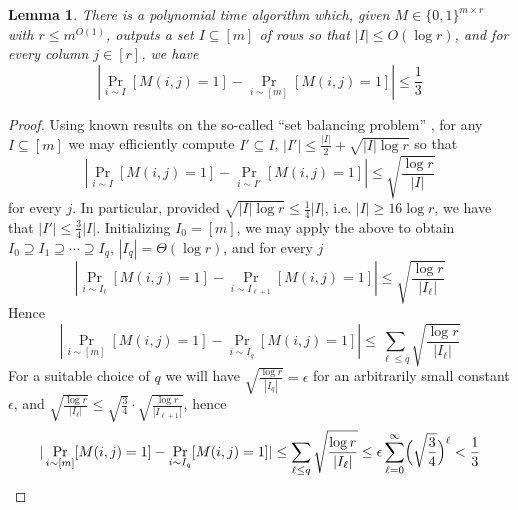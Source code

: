 \documentclass[11pt]{article}
\newtheorem{lemma}{Lemma}
\newcommand{\B}{\{0,1\}}
\begin{document}
\begin{lemma}
There is a polynomial time algorithm which, given $M \in \B^{m \times r}$ with $r \leq m^{O(1)}$, outputs a set $I \subseteq [m]$ of rows so that $|I| \leq O(\log r)$, and for every column $j \in [r]$, we have 
\[
|\Pr_{i \sim I}[M(i,j) = 1] - \Pr_{i \sim [m]}[M(i,j) = 1]| \leq \frac{1}{3}
\]
\end{lemma}
\begin{proof}
Using known results on the so-called ``set balancing problem'' \cite{setbalancing}, for any $I \subseteq [m]$ we may efficiently compute $I'\subseteq I$, $|I'| \leq \frac{|I|}{2} + \sqrt{|I| \log r}$ so that 
\[
|\Pr_{i \sim I}[M(i,j) = 1] - \Pr_{i \sim I
'}[M(i,j) = 1]| \leq \sqrt{\frac{\log r}{|I|}}
\]
for every $j$. In particular, provided $\sqrt{|I|\log r} \leq \frac{1}{4}|I|$, i.e. $|I| \geq 16\log r$, we have that $|I'| \leq \frac{3}{4}|I|$.
Initializing $I_0 = [m]$, we may apply the above to obtain $I_0 \supseteq I_1 \supseteq \cdots \supseteq I_q$, $ |I_q| = \Theta(\log r)$, and for every $j$
\[
|\Pr_{i \sim I_{\ell}}[M(i,j) = 1] - \Pr_{i \sim I_{\ell+1}}[M(i,j) = 1]| \leq \sqrt{\frac{\log r}{|I_\ell|}}
\]
Hence
\[
|\Pr_{i \sim [m]}[M(i,j) = 1] - \Pr_{i \sim I_{q}}[M(i,j) = 1]| \leq \sum_{\ell \leq q} \sqrt{\frac{\log r}{|I_\ell|}}
\]
For a suitable choice of $q$ we will have $\sqrt{\frac{\log r}{|I_q|}} = \epsilon$ for an arbitrarily small constant $\epsilon$, and $\sqrt{\frac{\log r}{|I_{\ell}|}} \leq \sqrt{\frac{3}{4}} \cdot \sqrt{\frac{\log r}{|I_{\ell+1}|}}$, hence
\[
|\Pr_{i \sim [m]}[M(i,j) = 1] - \Pr_{i \sim I_{q}}[M(i,j) = 1]| \leq \sum_{\ell \leq q} \sqrt{\frac{\log r}{|I_\ell|}} \leq \epsilon \sum_{\ell =0}^{\infty} \Bigl(\sqrt{\frac{3}{4}}\Bigr)^\ell < \frac{1}{3}
\]
\end{proof}

\end{document}
